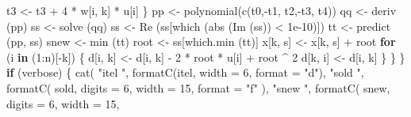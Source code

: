\documentclass[
  12pt,
]{book}
\newenvironment{Shaded}{\begin{snugshade}}{\end{snugshade}}
\newcommand{\AttributeTok}[1]{\textcolor[rgb]{0.77,0.63,0.00}{#1}}
\newcommand{\ControlFlowTok}[1]{\textcolor[rgb]{0.13,0.29,0.53}{\textbf{#1}}}
\newcommand{\DecValTok}[1]{\textcolor[rgb]{0.00,0.00,0.81}{#1}}
\newcommand{\FloatTok}[1]{\textcolor[rgb]{0.00,0.00,0.81}{#1}}
\newcommand{\FunctionTok}[1]{\textcolor[rgb]{0.00,0.00,0.00}{#1}}
\newcommand{\NormalTok}[1]{#1}
\newcommand{\OtherTok}[1]{\textcolor[rgb]{0.56,0.35,0.01}{#1}}
\newcommand{\SpecialCharTok}[1]{\textcolor[rgb]{0.00,0.00,0.00}{#1}}
\newcommand{\StringTok}[1]{\textcolor[rgb]{0.31,0.60,0.02}{#1}}
\theoremstyle{definition}
\theoremstyle{definition}
\theoremstyle{definition}
\theoremstyle{definition}
\theoremstyle{remark}
\begin{document}
\begin{Shaded}
\begin{Highlighting}[]
\NormalTok{            t3 }\OtherTok{\textless{}{-}}\NormalTok{ t3 }\SpecialCharTok{+} \DecValTok{4} \SpecialCharTok{*}\NormalTok{ w[i, k] }\SpecialCharTok{*}\NormalTok{ u[i]}
\NormalTok{          \}}
\NormalTok{          pp }\OtherTok{\textless{}{-}} \FunctionTok{polynomial}\NormalTok{(}\FunctionTok{c}\NormalTok{(t0,}\SpecialCharTok{{-}}\NormalTok{t1, t2,}\SpecialCharTok{{-}}\NormalTok{t3, t4))}
\NormalTok{          qq }\OtherTok{\textless{}{-}} \FunctionTok{deriv}\NormalTok{ (pp)}
\NormalTok{          ss }\OtherTok{\textless{}{-}} \FunctionTok{solve}\NormalTok{ (qq)}
\NormalTok{          ss }\OtherTok{\textless{}{-}} \FunctionTok{Re}\NormalTok{ (ss[}\FunctionTok{which}\NormalTok{ (}\FunctionTok{abs}\NormalTok{ (}\FunctionTok{Im}\NormalTok{ (ss)) }\SpecialCharTok{\textless{}} \FloatTok{1e{-}10}\NormalTok{)])}
\NormalTok{          tt }\OtherTok{\textless{}{-}} \FunctionTok{predict}\NormalTok{ (pp, ss)}
\NormalTok{          snew }\OtherTok{\textless{}{-}} \FunctionTok{min}\NormalTok{ (tt)}
\NormalTok{          root }\OtherTok{\textless{}{-}}\NormalTok{ ss[}\FunctionTok{which.min}\NormalTok{ (tt)]}
\NormalTok{          x[k, s] }\OtherTok{\textless{}{-}}\NormalTok{ x[k, s] }\SpecialCharTok{+}\NormalTok{ root}
          \ControlFlowTok{for}\NormalTok{ (i }\ControlFlowTok{in}\NormalTok{ (}\DecValTok{1}\SpecialCharTok{:}\NormalTok{n)[}\SpecialCharTok{{-}}\NormalTok{k]) \{}
\NormalTok{            d[i, k] }\OtherTok{\textless{}{-}}\NormalTok{ d[i, k] }\SpecialCharTok{{-}} \DecValTok{2} \SpecialCharTok{*}\NormalTok{ root }\SpecialCharTok{*}\NormalTok{ u[i] }\SpecialCharTok{+}\NormalTok{ root }\SpecialCharTok{\^{}} \DecValTok{2}
\NormalTok{            d[k, i] }\OtherTok{\textless{}{-}}\NormalTok{ d[i, k]}
\NormalTok{          \}}
\NormalTok{        \}}
\NormalTok{      \}}
      \ControlFlowTok{if}\NormalTok{ (verbose) \{}
        \FunctionTok{cat}\NormalTok{(}
          \StringTok{"itel "}\NormalTok{,}
          \FunctionTok{formatC}\NormalTok{(itel, }\AttributeTok{width =} \DecValTok{6}\NormalTok{, }\AttributeTok{format =} \StringTok{"d"}\NormalTok{),}
          \StringTok{"sold "}\NormalTok{,}
          \FunctionTok{formatC}\NormalTok{(}
\NormalTok{            sold,}
            \AttributeTok{digits =} \DecValTok{6}\NormalTok{,}
            \AttributeTok{width =} \DecValTok{15}\NormalTok{,}
            \AttributeTok{format =} \StringTok{"f"}
\NormalTok{          ),}
          \StringTok{"snew "}\NormalTok{,}
          \FunctionTok{formatC}\NormalTok{(}
\NormalTok{            snew,}
            \AttributeTok{digits =} \DecValTok{6}\NormalTok{,}
            \AttributeTok{width =} \DecValTok{15}\NormalTok{,}

\end{Highlighting}
\end{Shaded}
\end{document}
